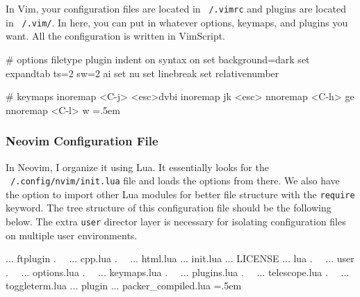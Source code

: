 \documentclass{article}
\newenvironment{cverbatim}
 {\SaveVerbatim{cverb}}
 {\endSaveVerbatim
  \flushleft\fboxrule=0pt\fboxsep=.5em
  \colorbox{cverbbg}{%
    \makebox[\dimexpr\linewidth-2\fboxsep][l]{\BUseVerbatim{cverb}}%
  }
  \endflushleft
}
\begin{document}
      In Vim, your configuration files are located in \texttt{~/.vimrc} and plugins are located in \texttt{~/.vim/}. In here, you can put in whatever options, keymaps, and plugins you want. All the configuration is written in VimScript. 

      \begin{cverbatim} 
        # options 
        filetype plugin indent on 
        syntax on 
        set background=dark
        set expandtab ts=2 sw=2 ai
        set nu
        set linebreak 
        set relativenumber        
        
        # keymaps
        inoremap <C-j> <esc>dvbi
        inoremap jk <esc>
        nnoremap <C-h> ge
        nnoremap <C-l> w 
      \end{cverbatim}
        
    \subsubsection{Neovim Configuration File}

      In Neovim, I organize it using Lua. It essentially looks for the \texttt{~/.config/nvim/init.lua} file and loads the options from there. We also have the option to import other Lua modules for better file structure with the \texttt{require} keyword. The tree structure of this configuration file should be the following below. The extra \texttt{user} director layer is necessary for isolating configuration files on multiple user environments.  
      
      \begin{cverbatim}
        ... ftplugin
        .   ... cpp.lua
        .   ... html.lua
        ... init.lua
        ... LICENSE
        ... lua
        .   ... user
        .       ... options.lua
        .       ... keymaps.lua
        .       ... plugins.lua
        .       ... telescope.lua
        .       ... toggleterm.lua
        ... plugin
            ... packer_compiled.lua
      \end{cverbatim}
\end{document}
